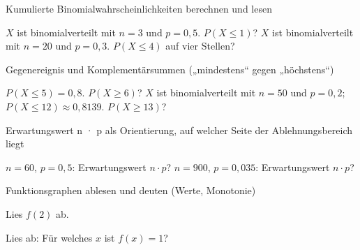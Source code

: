 \setcounter{aufgabe}{0}

\begin{aufgabe}{Kumulierte Binomialwahrscheinlichkeiten berechnen und lesen}
\begin{teile}
\teil $X$ ist binomialverteilt mit $n = 3$ und $p = 0{,}5$. $P(X \le 1)$?
\teil $X$ ist binomialverteilt mit $n = 20$ und $p = 0{,}3$. $P(X \le 4)$ auf vier Stellen?
\end{teile}
\end{aufgabe}

\begin{aufgabe}{Gegenereignis und Komplementärsummen („mindestens“ gegen „höchstens“)}
\begin{teile}
\teil $P(X \le 5) = 0{,}8$. $P(X \ge 6)$?
\teil $X$ ist binomialverteilt mit $n = 50$ und $p = 0{,}2$; $P(X \le 12) \approx 0{,}8139$. $P(X \ge 13)$?
\end{teile}
\end{aufgabe}

\begin{aufgabe}{Erwartungswert n · p als Orientierung, auf welcher Seite der Ablehnungsbereich liegt}
\begin{teile}
\teil $n = 60$, $p = 0{,}5$: Erwartungswert $n \cdot p$?
\teil $n = 900$, $p = 0{,}035$: Erwartungswert $n \cdot p$?
\end{teile}
\end{aufgabe}

\begin{aufgabe}{Funktionsgraphen ablesen und deuten (Werte, Monotonie)}
\begin{teile}
\teil Lies $f(2)$ ab.

\begin{ksys}[xmin=0,xmax=8,ymin=0,ymax=5,ablesen]\end{ksys}
\teil Lies ab: Für welches $x$ ist $f(x) = 1$?

\begin{ksys}[xmin=0,xmax=8,ymin=0,ymax=5,ablesen]\end{ksys}
\end{teile}
\end{aufgabe}

